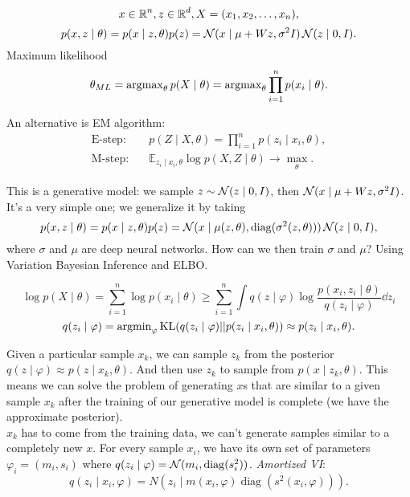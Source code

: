 \[
    x \in \operatorname{\mathbb{R}}^n, z \in \operatorname{\mathbb{R}}^d, X = (x_1, x_2, \ldots, x_n),
\]
\[
    p(x,z \mid \theta) = p(x \mid z, \theta) p(z) = \operatorname{\mathcal{N}} (x \mid \mu + Wz, \sigma^2 I) \operatorname{\mathcal{N}} (z \mid 0, I)
.\]
Maximum likelihood
\[
    \theta_{ML} = \operatorname{argmax}_\theta p(X\mid \theta) = 
    \operatorname{argmax}_\theta \prod_{i=1}^n p(x_i \mid \theta)
.\]

An alternative is EM algorithm:
\begin{equation*}
    \begin{aligned}
        \text{E-step:} \quad &p(Z \mid X, \theta) =\prod_{i=1}^n p(z_i \mid x_i, \theta), \\ 
        \text{M-step:} \quad &\mathbb{E}_{z_i \mid x_i, \theta} \log p(X, Z \mid \theta) \to \max_{\theta}.
    \end{aligned}
\end{equation*}

This is a generative model: we sample $z \sim \operatorname{\mathcal{N}} (z \mid 0, I)$, then $\operatorname{\mathcal{N}} (x \mid \mu + Wz, \sigma^2 I)$. It's a very simple one; we generalize it by taking 
\[
    p(x,z \mid \theta) = p(x \mid z, \theta) p(z) = \operatorname{\mathcal{N}}(x \mid \mu(z, \theta), \operatorname{diag}(\sigma^2(z, \theta))) \operatorname{\mathcal{N}} (z \mid 0, I),
\]
where $\sigma$ and $\mu$ are deep neural networks. How can we then train $\sigma$ and $\mu$? Using Variation Bayesian Inference and ELBO.

\[
    \log p(X \mid \theta) = \sum_{i=1}^{n} \log p(x_i \mid \theta) \ge
    \sum_{i=1}^{n} \int q(z\mid \varphi) \log \frac{p(x_i, z_i \mid \theta)}{q(z_i \mid \varphi)} \dd z_i
\]
\[
    q(z_i \mid \varphi) =
    \operatorname{argmin}_{\varphi} \operatorname{KL}(q(z_i \mid \varphi) || p(z_i \mid x_i, \theta)) \approx p(z_i \mid x_i, \theta)
.\]

Given a particular sample $x_k$, we can sample $z_k$ from the posterior $q(z \mid \varphi) \approx p(z \mid x_k, \theta)$.
And then use $z_k$ to sample from $p(x\mid z_k, \theta)$.
This means we can solve the problem of generating $x$s that are similar to a given sample $x_k$ after the training of our generative model is complete (we have the approximate posterior). \\ 

$x_k$ has to come from the training data, we can't generate samples similar to a completely new $x$.
For every sample $x_i$, we have its own set of parameters $\varphi_i = (m_i, s_i)$ where $q(z_i\mid \varphi) = \operatorname{\mathcal{N}}(m_i, \operatorname{diag}(s_i^2))$. \textit{Amortized VI}:
\[
    q(z_i \mid x_i, \varphi) = N(z_i \mid m(x_i, \varphi) \operatorname{diag}(s^2(x_i, \varphi)))
.\]

